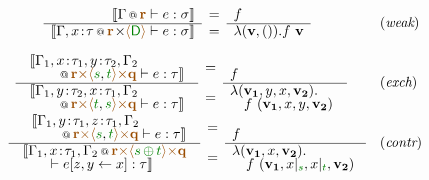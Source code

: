 \begin{figure}[t]
\begin{equation*}
\begin{array}{ll}
\hspace{2em}\semdeff
  {\coctx{\Gamma}{ \aclrd{\textbf{r}} } \vdash e : \sigma}
  {\coctx{\Gamma,x \!:\! \tau}{\aclrd{\textbf{r}} \cons \alift{ \cclrd{\cclrd{\ident{D}}} }} \vdash e : \sigma}
  {f}
  {\lambda(\textbf{v}, ()) . f~\textbf{v} }
& (\emph{weak})
\\[1.5em]
\hspace{0em}\mdeff
  {\begin{array}{l}\sem{\coctx{\Gamma_1,x\!:\!\tau_1,y\!:\!\tau_2,\Gamma_2\\[-0.25em]\qquad}
     {\aclrd{\textbf{r}} \atimes \alift{\cclrd{s},\cclrd{t}} \atimes \aclrd{\textbf{q}}} \vdash e : \tau}\end{array}}
  {\begin{array}{l}\sem{\coctx{\Gamma_1,y\!:\!\tau_2,x\!:\!\tau_1,\Gamma_2\\[-0.25em]\qquad}{\aclrd{\textbf{r}}
          \atimes \alift{\cclrd{t},\cclrd{s}} \atimes \aclrd{\textbf{q}}} \vdash e : \tau}\end{array}}
  {\begin{array}{l}~\\[-0.25em]\hspace{-0.5em}f\end{array}}
  {\hspace{-0.5em}\begin{array}{l}
  \lambda(\mathbf{v_1}, y, x, \mathbf{v_2}) .\\[-0.25em]
    \quad f~(\mathbf{v_1}, x, y, \mathbf{v_2})\end{array} }
& (\emph{exch})
\\[1.5em]
\hspace{-0.5em}\mdeff
  {\begin{array}{l}\sem{\coctx{\Gamma_1,y\!:\!\tau_1,z\!:\!\tau_1,\Gamma_2\\[-0.25em]\qquad}
      {\aclrd{\textbf{r}} \atimes \alift{\cclrd{s},\cclrd{t}} \atimes \aclrd{\textbf{q}}} \vdash e : \tau}\end{array}}
  {\begin{array}{l}\sem{\coctx{\Gamma_1,x\!:\!\tau_1,\Gamma_2}{\aclrd{\textbf{r}}
          \atimes \alift{\cclrd{s} \,\cpar\, \cclrd{t}} \atimes \aclrd{\textbf{q}}} \\[-0.25em] \qquad\vdash \subst{e}{z,y}{x} : \tau}\end{array}}
  {\begin{array}{l}~\\[-0.25em]\hspace{-0.5em}f\end{array}}
  {\hspace{-0.5em}\begin{array}{l}\lambda(\mathbf{v_1}, x, \mathbf{v_2}) .\\[-0.25em]
  \quad f~(\mathbf{v_1}, \restr{x}{\cclrd{s}}, \restr{x}{\cclrd{t}}, \mathbf{v_2})\end{array}\hspace{-0.5em}~}
& (\emph{contr})
\end{array}
\end{equation*}


\end{figure}
